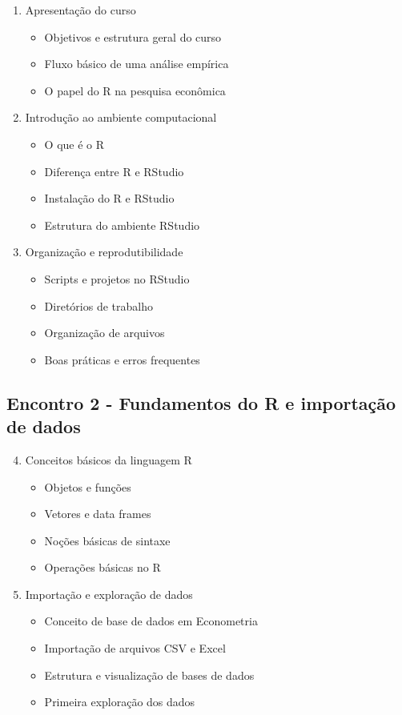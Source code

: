 \documentclass[12pt,a4paper]{article}
\begin{document}
	\begin{enumerate}[label=\arabic*.]
		
		\item Apresentação do curso
		\begin{itemize}
			\item Objetivos e estrutura geral do curso
			\item Fluxo básico de uma análise empírica
			\item O papel do R na pesquisa econômica
		\end{itemize}
		
		\item Introdução ao ambiente computacional
		\begin{itemize}
			\item O que é o R
			\item Diferença entre R e RStudio
			\item Instalação do R e RStudio
			\item Estrutura do ambiente RStudio
		\end{itemize}
		
		\item Organização e reprodutibilidade
		\begin{itemize}
			\item Scripts e projetos no RStudio
			\item Diretórios de trabalho
			\item Organização de arquivos
			\item Boas práticas e erros frequentes
		\end{itemize}
		
	\end{enumerate}
	
	\subsection*{Encontro 2 - Fundamentos do R e importação de dados}
	
	\begin{enumerate}[label=\arabic*.]
		\setcounter{enumi}{3}
		
		\item Conceitos básicos da linguagem R
		\begin{itemize}
			\item Objetos e funções
			\item Vetores e data frames
			\item Noções básicas de sintaxe
			\item Operações básicas no R
		\end{itemize}
		
		\item Importação e exploração de dados
		\begin{itemize}
			\item Conceito de base de dados em Econometria
			\item Importação de arquivos CSV e Excel
			\item Estrutura e visualização de bases de dados
			\item Primeira exploração dos dados
		\end{itemize}
		
	\end{enumerate}
	
\end{document}
